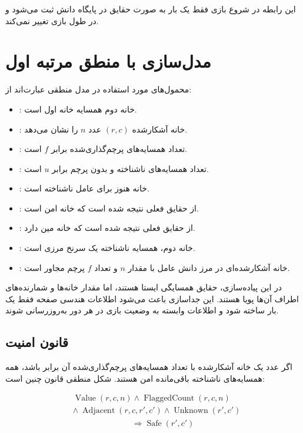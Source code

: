 \documentclass[10.5pt]{exam}
\begin{document}
این رابطه در شروع بازی فقط یک بار به صورت حقایق
در پایگاه دانش ثبت می‌شود و در طول بازی تغییر نمی‌کند.

\section{مدل‌سازی با منطق مرتبه اول}
محمول‌های مورد استفاده در مدل منطقی عبارت‌اند از:

\begin{itemize}
    \item {}: خانه دوم همسایه خانه اول است.
    \item {}: خانه آشکارشده $(r,c)$ عدد $n$ را نشان می‌دهد.
    \item {}: تعداد همسایه‌های پرچم‌گذاری‌شده برابر $f$ است.
    \item {}: تعداد همسایه‌های ناشناخته و بدون پرچم برابر $u$ است.
    \item {}: خانه هنوز برای عامل ناشناخته است.
    \item {}: از حقایق فعلی نتیجه شده است که خانه امن است.
    \item {}: از حقایق فعلی نتیجه شده است که خانه مین دارد.
    \item {}: خانه دوم، همسایه ناشناخته یک سرنخ مرزی است.
    \item {}: خانه آشکارشده‌ای در مرز دانش عامل با مقدار $n$ و تعداد $f$ پرچم مجاور است.
\end{itemize}

در این پیاده‌سازی، حقایق همسایگی ایستا هستند، اما مقدار خانه‌ها و شمارنده‌های اطراف آن‌ها پویا هستند. این جداسازی باعث می‌شود اطلاعات هندسی صفحه فقط یک بار ساخته شود و اطلاعات وابسته به وضعیت بازی در هر دور به‌روزرسانی شوند.

\subsection{قانون امنیت}
اگر عدد یک خانه آشکارشده با تعداد همسایه‌های پرچم‌گذاری‌شده آن برابر باشد، همه همسایه‌های ناشناخته باقی‌مانده امن هستند. شکل منطقی قانون چنین است:

\[
    \begin{aligned}
         & \operatorname{Value}(r,c,n) \land
        \operatorname{FlaggedCount}(r,c,n)                        \\
         & \land\ \operatorname{Adjacent}(r,c,r',c')
        \land \operatorname{Unknown}(r',c')                       \\
         & \hspace{3cm}\Longrightarrow \operatorname{Safe}(r',c')
    \end{aligned}
\]
\end{document}
